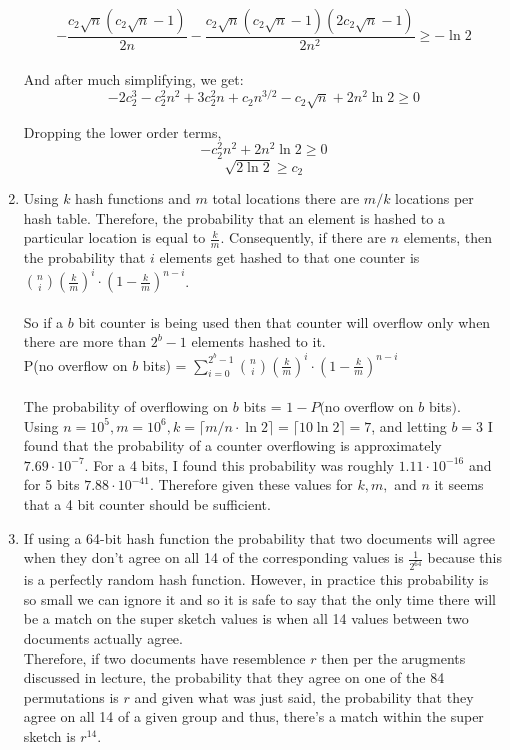 \documentclass{article}
\begin{document}
\begin{enumerate}
	\[-\frac{c_2\sqrt{n} (c_2\sqrt{n} - 1) }{2n} - \frac{c_2\sqrt{n}(c_2\sqrt{n}-1)(2c_2\sqrt{n} - 1)} {2n^2} \geq -\ln2 \] \\

	And after much simplifying, we get: \\
	
	\[-2c_2^3 - c_2^2n^2 + 3c_2^2n+c_2n^{3/2} - c_2\sqrt{n} + 2n^2\ln2 \geq 0 \]
	
	Dropping the lower order terms,\\
	
	\[-c_2^2n^2+2n^2\ln2 \geq 0 \]
	\[\sqrt{2\ln2} \geq c_2 \]


	\item Using $k$ hash functions and $m$ total locations there are $m / k$ locations per hash table.  Therefore, the probability that an element is hashed to a particular location is equal to $\frac{k}{m}$.  Consequently, if there are $n$ elements, then the probability that $i$ elements get hashed to that one counter is ${n \choose i}(\frac{k}{m})^i\cdot (1 - \frac{k}{m})^{n - i}$.  \\\\
	So if a $b$ bit counter is being used then that counter will overflow only when there are more than $2^{b} - 1$ elements hashed to it.  \\
	P(no overflow on $b$ bits) = $\displaystyle\sum_{i = 0}^{2^b - 1} {n \choose i} (\frac{k}{m})^i\cdot (1 - \frac{k}{m})^{n - i}$ \\\\
	The probability of overflowing on $b$ bits = $1 - P($no overflow on $b$ bits$)$. \\
	Using $n = 10^5, m = 10^6, k = \lceil m / n \cdot \ln2 \rceil = \lceil 10 \ln 2 \rceil = 7$, and letting $b = 3$ I found that the probability of a counter overflowing is approximately $7.69 \cdot 10^{-7}$.  For a 4 bits, I found this probability was roughly $1.11 \cdot 10^{-16}$ and for 5 bits $7.88\cdot 10^{-41}$.   Therefore given these values for $k,m,$ and $n$ it seems that a 4 bit counter should be sufficient.  
	
	\item If using a 64-bit hash function the probability that two documents will agree when they don't agree on all 14 of the corresponding values is $\frac{1}{2^{64}}$ because this is a perfectly random hash function.  However, in practice this probability is so small we can ignore it and so it is safe to say that the only time there will be a match on the super sketch values is when all 14 values between two documents actually agree. \\
	Therefore, if two documents have resemblence $r$ then per the arugments discussed in lecture, the probability that they agree on one of the 84 permutations is $r$ and given what was just said, the probability that they agree on all 14 of a given group and thus, there's a match within the super sketch is $r^{14}$.  \\
	

\end{enumerate}
\end{document}
